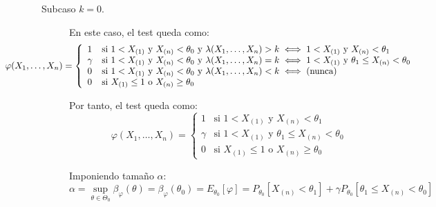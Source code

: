 \begin{ejercicio}
\begin{description}
        \begin{description}
            \item[Subcaso $k = 0$.] En este caso, el test queda como:
            \begin{equation*}
                \hspace{-2.5cm}\varphi(X_1, \ldots, X_n) = \left\{\begin{array}{ll}
                    1 & \text{si\ } 1 < X_{(1)} \text{\ y\ } X_{(n)} < \theta_0 \text{\ y\ } \lambda(X_1, \ldots, X_n) > k \iff 1 < X_{(1)} \text{\ y\ } X_{(n)} < \theta_1 \\
                    \gamma & \text{si\ } 1 < X_{(1)} \text{\ y\ } X_{(n)} < \theta_0 \text{\ y\ } \lambda(X_1, \ldots, X_n) = k \iff 1 < X_{(1)} \text{\ y\ } \theta_1 \leq X_{(n)} < \theta_0 \\
                    0 & \text{si\ } 1 < X_{(1)} \text{\ y\ } X_{(n)} < \theta_0 \text{\ y\ } \lambda(X_1, \ldots, X_n) < k \iff \text{(nunca)} \\
                    0 & \text{si\ } X_{(1)} \leq 1 \text{\ o\ } X_{(n)} \geq \theta_0
                \end{array}\right.
            \end{equation*}

            Por tanto, el test queda como:
            \begin{equation*}
                \varphi(X_1, \ldots, X_n) = \left\{\begin{array}{ll}
                    1 & \text{si\ } 1 < X_{(1)} \text{\ y\ } X_{(n)} < \theta_1 \\
                    \gamma & \text{si\ } 1 < X_{(1)} \text{\ y\ } \theta_1 \leq X_{(n)} < \theta_0 \\
                    0 & \text{si\ } X_{(1)} \leq 1 \text{\ o\ } X_{(n)} \geq \theta_0
                \end{array}\right.
            \end{equation*}

            Imponiendo tamaño $\alpha$:
            \begin{equation*}
                \alpha = \sup_{\theta \in \Theta_0}\beta_\varphi(\theta) = \beta_\varphi(\theta_0) = E_{\theta_0}[\varphi] = P_{\theta_0}[X_{(n)} < \theta_1] + \gamma P_{\theta_0}[\theta_1 \leq X_{(n)} < \theta_0]
            \end{equation*}


\end{description}
\end{description}
\end{ejercicio}
